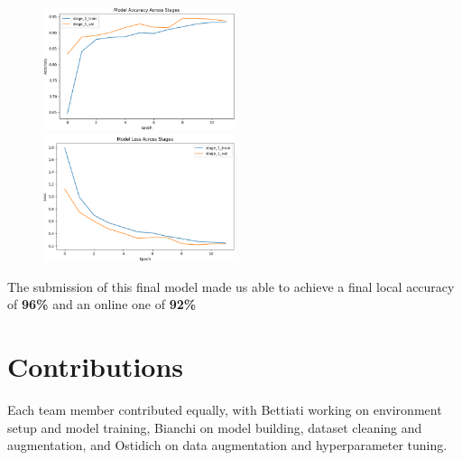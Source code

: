 \documentclass[11pt]{article}
\begin{document}
\begin{multicols}{2}
        \begin{figure}[h!]
            \centering
            \small
            \includegraphics[width=0.5\textwidth]{images/final_accuracy.png}
            \includegraphics[width=0.5\textwidth]
            {images/final_loss.png}
        \end{figure}
        
        The submission of this final model made us able to achieve a final local accuracy of \textbf{96\%} and an online one of \textbf{92\%}
        
        \section{Contributions}
        Each team member contributed equally, with Bettiati working on environment setup and model training, Bianchi on model building, dataset cleaning and augmentation, and Ostidich on data augmentation and hyperparameter tuning.

        
        
        
        
    \end{multicols}
\end{document}
